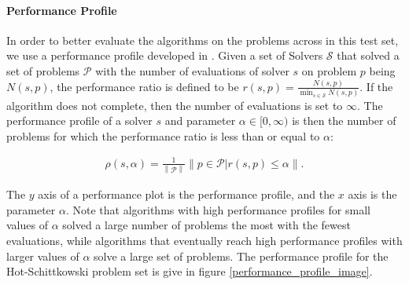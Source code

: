 \paragraph*{Performance Profile}
\label{performance_profile}
In order to better evaluate the algorithms on the problems across in this test set, we use a performance profile developed in \cite{More:2009:BDO:1654367.1654371}.
Given a set of Solvers $\mathcal S$ that solved a set of problems $\mathcal P$ with the number of evaluations of solver $s$ on problem $p$ being $N(s, p)$, the performance ratio is defined to be $r(s, p) = \frac{N(s, p)}{\min_{s \in \mathcal S} N(s, p)}$.
If the algorithm does not complete, then the number of evaluations is set to $\infty$.
The performance profile of a solver $s$ and parameter $\alpha \in [0, \infty)$ is then the number of problems for which the performance ratio is less than or equal to $\alpha$: 

\begin{align}
\rho(s, \alpha) = \frac 1 {\left\|\mathcal P \right\|} \left\|p \in \mathcal P | r(s, p) \le \alpha\right\|.
\end{align}

The $y$ axis of a performance plot is the performance profile, and the $x$ axis is the parameter $\alpha$.
Note that algorithms with high performance profiles for small values of $\alpha$ solved a large number of problems the most with the fewest evaluations, while algorithms that eventually reach high performance profiles with larger values of $\alpha$ solve a large set of problems.
The performance profile for the Hot-Schittkowski problem set is give in figure \cref{performance_profile_image}.


